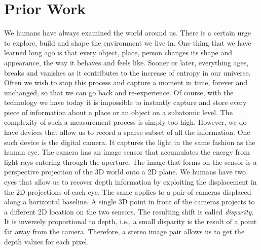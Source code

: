 \chapter{Prior Work}
	
	We humans have always examined the world around us. 
	There is a certain urge to explore, build and shape the environment we live in.
	One thing that we have learned long ago is that every object, place, person changes its shape and appearance, the way it behaves and feels like. Sooner or later, everything ages, breaks and vanishes as it contributes to the increase of entropy in our universe.
	Often we wish to stop this process and capture a moment in time, forever and unchanged, so that we can go back and re-experience.
	Of course, with the technology we have today it is impossible to instantly capture and store every piece of information about a place or an object on a subatomic level.
	The complexity of such a measurement process is simply too high.
	However, we do have devices that allow us to record a sparse subset of all the information.
	One such device is the digital camera.
	It captures the light in the same fashion as the human eye.
	The camera has an image sensor that accumulates the energy from light rays entering through the aperture.
	The image that forms on the sensor is a perspective projection of the 3D world onto a 2D plane.
	We humans have two eyes that allow us to recover depth information by exploiting the displacement in the 2D projections of each eye.
	The same applies to a pair of cameras displaced along a horizontal baseline.
	A single 3D point in front of the cameras projects to a different 2D location on the two sensors.
	The resulting shift is called \emph{disparity}.
	It is inversely proportional to depth, i.e., a small disparity is the result of a point far away from the camera.
	Therefore, a stereo image pair allows us to get the depth values for each pixel.
	
